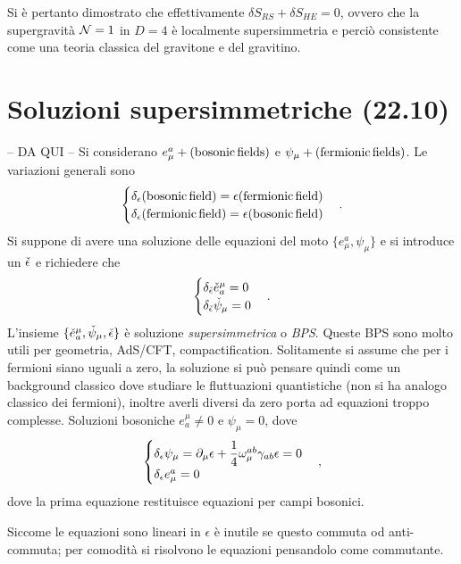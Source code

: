 Si è pertanto dimostrato che effettivamente $\delta S_{RS} + \delta S_{HE} = 0$, ovvero che la supergravità $\mathcal{N} = 1$ in $D = 4$ è localmente supersimmetria e perciò consistente come una teoria classica del gravitone e del gravitino.

\section{Soluzioni supersimmetriche (22.10)}
-- DA QUI --
Si considerano $e^a_\mu + (\mathrm{bosonic\,fields})$ e $\psi_\mu + (\mathrm{fermionic\,fields})$. Le variazioni generali sono
\begin{equation}
    \begin{cases}
        \delta_\epsilon(\mathrm{bosonic\,field}) = \epsilon(\mathrm{fermionic\,field}) \\
        \delta_\epsilon(\mathrm{fermionic\,field}) = \epsilon(\mathrm{bosonic\,field})
    \end{cases}.
\end{equation}
Si suppone di avere una soluzione delle equazioni del moto $\{e^a_\mu,\psi_\mu\}$ e si introduce un $\check{\epsilon}$ e richiedere che 
\begin{equation}
    \begin{cases}
        \delta_{\check{\epsilon}}\check{e}^\mu_a = 0 \\
        \delta_{\check{\epsilon}}\check{\psi}_\mu = 0
    \end{cases}.
\end{equation}
L'insieme $\{\check{e}_a^\mu,\check{\psi}_\mu,\check{\epsilon}\}$ è soluzione \emph{supersimmetrica} o \emph{BPS}. Queste BPS sono molto utili per geometria, AdS/CFT, compactification. Solitamente si assume che per i fermioni siano uguali a zero, la soluzione si può pensare quindi come un background classico dove studiare le fluttuazioni quantistiche (non si ha analogo classico dei fermioni), inoltre averli diversi da zero porta ad equazioni troppo complesse. Soluzioni bosoniche $e^\mu_a \neq 0$ e $\psi_\mu = 0$, dove 
\begin{equation}
    \begin{cases}
        \delta_\epsilon\psi_\mu = \partial_\mu\epsilon + \dfrac{1}{4}\omega_\mu^{ab}\gamma_{ab}\epsilon = 0 \\
        \delta_\epsilon e^a_\mu = 0
    \end{cases},
\end{equation}
dove la prima equazione restituisce equazioni per campi bosonici. 
\begin{obs}
    Siccome le equazioni sono lineari in $\epsilon$ è inutile se questo commuta od anti-commuta; per comodità si risolvono le equazioni pensandolo come commutante.
\end{obs}
